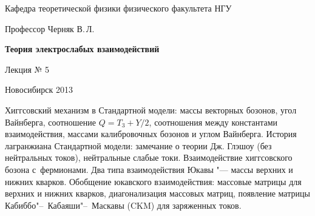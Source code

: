 \documentclass[12pt,pagesize,paper=192mm:108mm]{scrbook}
\begin{document}
\begin{titlepage}
\begin{center}
    Кафедра теоретической физики физического факультета НГУ
    \medskip

    \Large
    Профессор Черняк В.\,Л.
    \bigskip

    \huge
    \textbf{Теория электрослабых взаимодействий}
    \bigskip

    \Large
    Лекция № 5
    \vfill

    \vfill

\normalsize    Новосибирск 2013
  \smallskip

  \ccbysa
  \end{center}
\end{titlepage}
\newpage

\vspace*{-1em}
\begin{center}
 \vfill
  \begin{minipage}{0.66\linewidth}
    Хиггсовский механизм в Стандартной модели: массы векторных
    бозонов, угол Вайнберга, соотношение $Q=T_3+Y/2$, соотношения
    между константами взаимодействия, массами калибровочных бозонов и
    углом Вайнберга.  История лагранжиана Стандартной модели:
    замечание о теории Дж. Глэшоу (без нейтральных токов), нейтральные
    слабые токи.  Взаимодействие хиггсовского бозона с~фермионами. Два
    типа взаимодействия Юкавы "--- массы верхних и нижних
    кварков. Обобщение юкавского взаимодействия: массовые матрицы для
    верхних и нижних кварков, диагонализация массовых матриц,
    появление матрицы Кабиббо"--~Кабаяши"--~Маскавы (CKM) для заряженных
    токов.
  \end{minipage}
  \vfill

\end{center}
\end{document}

